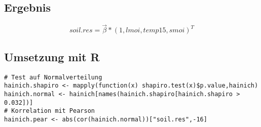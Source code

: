 \subsection{Ergebnis}

$$soil.res = \vec{\beta} * (1,lmoi,temp15,smoi)^T$$


\subsection{Umsetzung mit R}

\begin{lstlisting}
# Test auf Normalverteilung
hainich.shapiro <- mapply(function(x) shapiro.test(x)$p.value,hainich)
hainich.normal <- hainich[names(hainich.shapiro[hainich.shapiro > 0.032])]
# Korrelation mit Pearson
hainich.pear <- abs(cor(hainich.normal))["soil.res",-16]
\end{lstlisting}

